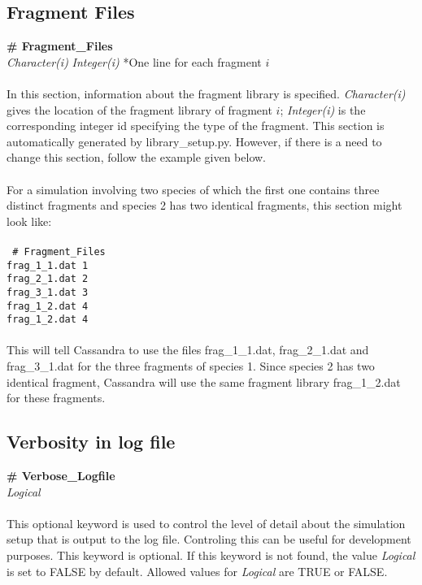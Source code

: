 \subsection{Fragment Files}\label{sec:Fragment_Files}
{\bf \# Fragment\_Files} \\
{\it Character(i)} {\it Integer(i)} *One line for each fragment $i$ \\ \\
%
In this section, information about the fragment library is specified. {\it Character(i)} gives
the location of the fragment library of fragment $i$; {\it Integer(i)} is the
corresponding integer id specifying the type of the fragment. This section is automatically
generated by library\_setup.py. However, if there is a need to change this section, follow the example
given below. \\ \\
%
For a simulation involving two species of which the first one contains three distinct fragments and species 2
has two identical fragments, this section might look like: \\ \\
%
\texttt{
\# Fragment\_Files  \\
frag\_1\_1.dat 1 \\
frag\_2\_1.dat 2 \\
frag\_3\_1.dat 3 \\
frag\_1\_2.dat 4 \\
frag\_1\_2.dat 4 \\ \\
}
%
This will tell Cassandra to use the files frag\_1\_1.dat, frag\_2\_1.dat and frag\_3\_1.dat for the three
fragments of species 1. Since species 2 has two identical fragment, Cassandra will use the same
fragment library frag\_1\_2.dat for these fragments. 

%
%

\subsection{Verbosity in log file}\label{sec:Verbose_Logfile}
{\bf \# Verbose\_Logfile} \\
{\it Logical} \\ \\
%
This optional keyword is used to control the level of detail about the simulation
setup that is output to the log file. Controling this can be useful for development
purposes. This keyword is optional. If this keyword is not found,
the value {\it Logical} is set to FALSE by default. Allowed values for {\it Logical} are
TRUE or FALSE.

